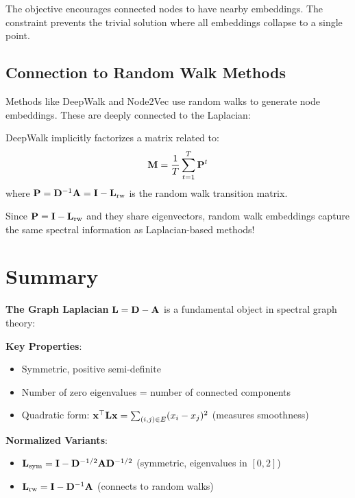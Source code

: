 \begin{notechapter}
\begin{intuition}
The objective encourages connected nodes to have nearby embeddings. The constraint prevents the trivial solution where all embeddings collapse to a single point.
\end{intuition}

\subsection{Connection to Random Walk Methods}

Methods like DeepWalk and Node2Vec use random walks to generate node embeddings. These are deeply connected to the Laplacian:

\begin{keyidea}
DeepWalk implicitly factorizes a matrix related to:
\begin{equation}
\mathbf{M} = \frac{1}{T} \sum_{t=1}^{T} \mathbf{P}^t
\end{equation}
where $\mathbf{P} = \mathbf{D}^{-1}\mathbf{A} = \mathbf{I} - \mathbf{L}_{\text{rw}}$ is the random walk transition matrix.

Since $\mathbf{P} = \mathbf{I} - \mathbf{L}_{\text{rw}}$ and they share eigenvectors, random walk embeddings capture the same spectral information as Laplacian-based methods!
\end{keyidea}

\section{Summary}

\begin{keyidea}
\textbf{The Graph Laplacian} $\mathbf{L} = \mathbf{D} - \mathbf{A}$ is a fundamental object in spectral graph theory:

\textbf{Key Properties}:
\begin{itemize}
    \item Symmetric, positive semi-definite
    \item Number of zero eigenvalues = number of connected components
    \item Quadratic form: $\mathbf{x}^\top \mathbf{L} \mathbf{x} = \sum_{(i,j) \in E} (x_i - x_j)^2$ (measures smoothness)
\end{itemize}

\textbf{Normalized Variants}:
\begin{itemize}
    \item $\mathbf{L}_{\text{sym}} = \mathbf{I} - \mathbf{D}^{-1/2}\mathbf{A}\mathbf{D}^{-1/2}$ (symmetric, eigenvalues in $[0,2]$)
    \item $\mathbf{L}_{\text{rw}} = \mathbf{I} - \mathbf{D}^{-1}\mathbf{A}$ (connects to random walks)
\end{itemize}


\end{keyidea}
\end{notechapter}

